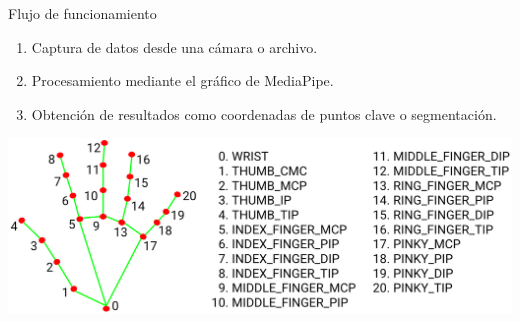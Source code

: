 \begin{frame}{Flujo de funcionamiento}
    \begin{enumerate}
        \item Captura de datos desde una cámara o archivo.
        \item Procesamiento mediante el gráfico de MediaPipe.
        \item Obtención de resultados como coordenadas de puntos clave o segmentación.
    \end{enumerate}
    \begin{center}
        \includegraphics[width=0.6\linewidth]{01_MediaPipe/hand_landmarks.png}
    \end{center}
\end{frame}

